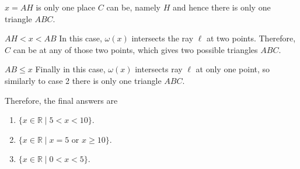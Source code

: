 \begin{solution}
\begin{case}{$x = AH$}
        is only one place $C$ can be, namely $H$ and hence there is only one
        triangle $ABC$.
    \end{case}
    \begin{case}{$AH < x < AB$}
        In this case, $\omega(x)$ intersects the ray $\ell$ at two points.
        Therefore, $C$ can be at any of those two points, which gives two
        possible triangles $ABC$.
    \end{case}
    \begin{case}{$AB \leq x$}
        Finally in this case, $\omega(x)$ intersects ray $\ell$ at only one
        point, so similarly to case 2 there is only one triangle $ABC$.
    \end{case}
        Therefore, the final answers are 
        \begin{enumerate}
            \item $\{ x \in \mathbb{R} \mid 5 < x < 10 \}$.
            \item $\{ x \in \mathbb{R} \mid x = 5 \text{ or } x \geq 10 \}$.
            \item $\{ x \in \mathbb{R} \mid 0 < x < 5 \}$. \qedhere
        \end{enumerate}
\end{solution}

